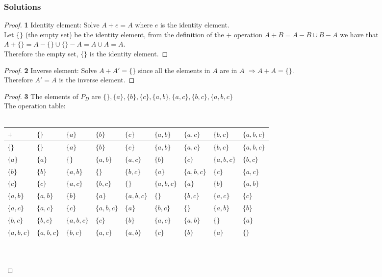 \documentclass[11pt]{article}
\begin{document}
	\subsubsection*{Solutions}
		\begin{proof}{\textbf{1}}
			Identity element: Solve $A+e = A$ where $e$ is the identity element.\\
			Let $\{\}$ (the empty set) be the identity element, from the definition of the $+$ operation $A+B = A-B \cup B-A$ we have that\\
			$A+\{\} = A - \{\} \cup \{\} - A = A \cup A = A$.\\
			Therefore the empty set, $\{\}$ is the identity element.  		
		\end{proof}
		\begin{proof}{\textbf{2}}
			Inverse element: Solve $A+A'=\{\}$ since all the elements in $A$ are in $A$ $\Rightarrow A+A = \{\}$.\\
			Therefore $A' = A$ is the inverse element.
		\end{proof}
		\begin{proof}{\textbf{3}}
			The elements of $P_D$ are $\{\}, \{a\}, \{b\}, \{c\}, \{a,b\}, \{a,c\}, \{b,c\}, \{a,b,c\}$\\
			The operation table:\\
			\\
			\begin{adjustbox}{max width=\textwidth,center}
			\begin{tabular}{l|llllllll}
				$+$ & $\{\}$ & $\{a\}$ & $\{b\}$ & $\{c\}$ & $\{a,b\}$ & $\{a,c\}$ & $\{b,c\}$ & $\{a,b,c\}$ \\ \hline
				$\{\}$ & $\{\}$ & $\{a\}$ & $\{b\}$ & $\{c\}$ & $\{a,b\}$ & $\{a,c\}$ & $\{b,c\}$ & $\{a,b,c\}$ \\ 
				$\{a\}$ & $\{a\}$ & $\{\}$ & $\{a,b\}$ & $\{a,c\}$ & $\{b\}$ & $\{c\}$ & $\{a,b,c\}$ & $\{b,c\}$ \\
				$\{b\}$ & $\{b\}$ & $\{a,b\}$ & $\{\}$ & $\{b,c\}$ & $\{a\}$ & $\{a,b,c\}$ & $\{c\}$ & $\{a,c\}$ \\
				$\{c\}$ & $\{c\}$ & $\{a,c\}$ & $\{b,c\}$ & $\{\}$ & $\{a,b,c\}$ & $\{a\}$ & $\{b\}$ & $\{a,b\}$ \\
				$\{a,b\}$ & $\{a,b\}$ & $\{b\}$ & $\{a\}$ & $\{a,b,c\}$ & $\{\}$ & $\{b,c\}$ & $\{a,c\}$ & $\{c\}$ \\
				$\{a,c\}$ & $\{a,c\}$ & $\{c\}$ & $\{a,b,c\}$ & $\{a\}$ & $\{b,c\}$ & $\{\}$ & $\{a,b\}$ & $\{b\}$ \\
				$\{b,c\}$ & $\{b,c\}$ & $\{a,b,c\}$ & $\{c\}$ & $\{b\}$ & $\{a,c\}$ & $\{a,b\}$ & $\{\}$ & $\{a\}$ \\
				$\{a,b,c\}$ & $\{a,b,c\}$ & $\{b,c\}$ & $\{a,c\}$ & $\{a,b\}$ & $\{c\}$ & $\{b\}$ & $\{a\}$ & $\{\}$ \\
			\end{tabular}
			\end{adjustbox}
			\\\\
		\end{proof}
\end{document}
